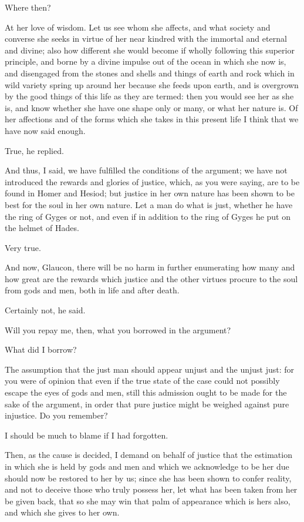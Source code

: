 Where then?

At her love of wisdom. Let us see whom she affects, and what society and
converse she seeks in virtue of her near kindred with the immortal
and eternal and divine; also how different she would become if wholly
following this superior principle, and borne by a divine impulse out of
the ocean in which she now is, and disengaged from the stones and shells
and things of earth and rock which in wild variety spring up around her
because she feeds upon earth, and is overgrown by the good things of
this life as they are termed: then you would see her as she is, and know
whether she have one shape only or many, or what her nature is. Of her
affections and of the forms which she takes in this present life I think
that we have now said enough.

True, he replied.

And thus, I said, we have fulfilled the conditions of the argument; we
have not introduced the rewards and glories of justice, which, as you
were saying, are to be found in Homer and Hesiod; but justice in her own
nature has been shown to be best for the soul in her own nature. Let a
man do what is just, whether he have the ring of Gyges or not, and even
if in addition to the ring of Gyges he put on the helmet of Hades.

Very true.

And now, Glaucon, there will be no harm in further enumerating how
many and how great are the rewards which justice and the other virtues
procure to the soul from gods and men, both in life and after death.

Certainly not, he said.

Will you repay me, then, what you borrowed in the argument?

What did I borrow?

The assumption that the just man should appear unjust and the unjust
just: for you were of opinion that even if the true state of the case
could not possibly escape the eyes of gods and men, still this admission
ought to be made for the sake of the argument, in order that pure
justice might be weighed against pure injustice. Do you remember?

I should be much to blame if I had forgotten.

Then, as the cause is decided, I demand on behalf of justice that the
estimation in which she is held by gods and men and which we acknowledge
to be her due should now be restored to her by us; since she has been
shown to confer reality, and not to deceive those who truly possess her,
let what has been taken from her be given back, that so she may win that
palm of appearance which is hers also, and which she gives to her own.


